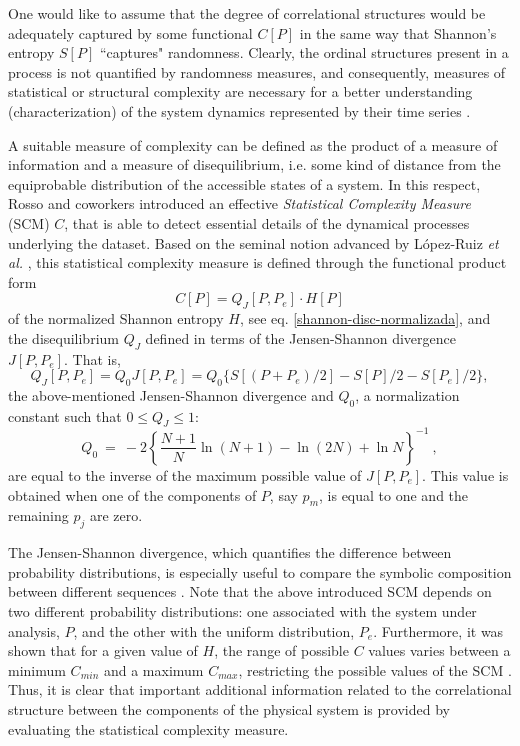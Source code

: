 One would like to assume that the degree of correlational structures would be adequately captured by some functional $C[P]$ in the same way that Shannon's entropy $S[P]$ \cite{Shannon1948} ``captures" randomness.
Clearly, the ordinal structures present in a process is not quantified by randomness measures, and consequently, measures of statistical or structural complexity are necessary for a better understanding (characterization) of the system dynamics represented by their time series \cite{Feldman1998}. 

A suitable measure of complexity can be defined as the product of a measure of information and a measure of
disequilibrium, i.e. some kind of distance from the equiprobable distribution of the accessible states of 
a system. 
In this respect, Rosso and coworkers \cite{Lamberti2004} introduced an effective {\it Statistical Complexity Measure\/} (SCM) $C$, that is able to detect essential details of the dynamical processes underlying the dataset.
Based on the seminal notion advanced by L\'opez-Ruiz {\it et al.} \cite{Lopez-Ruiz1995}, this statistical complexity measure\cite{Martin2003,Lamberti2004} is defined through the functional product form
\begin{equation}
C[P] = Q_{J}[P,P_e] \cdot H[P]
\label{complexity}
\end{equation}
of the normalized Shannon entropy $H$, see eq. \eqref{shannon-disc-normalizada}, and the disequilibrium $Q_{J}$ defined in terms of the Jensen-Shannon divergence $J[P, P_e]$.
That is,
\begin{equation}
\label{disequilibrium}	
Q_{J} [ P, P_e] = Q_{0} J[ P, P_e] = Q_{0} \{ S[(P + P_e)/2 ] - S[ P ]/2 - S[P_e]/2\},
\end{equation}
the above-mentioned Jensen-Shannon divergence and $Q_0$, a normalization constant such that $0 \leq Q_{J} \leq 1$:
\begin{equation}
Q_0 ~=~ -2 \left\{ {\frac{N+1}{N}} \ln (N+1) - \ln (2N) + \ln N \right\}^{-1} \ ,
\label{q0-jensen-1}
\end{equation}
are equal to the inverse of the maximum possible value of $J [P,P_e]$.
This value is obtained when one of the components of $P$, say $p_m$, is equal to one and the remaining $p_j$ are zero.

The Jensen-Shannon divergence, which quantifies the difference between probability distributions, is especially useful to compare the symbolic composition between different sequences \cite{Grosse2002}.
Note that the above introduced SCM depends on two different probability distributions: one associated with the system under analysis, $P$, and the other with the uniform distribution, $P_e$.
Furthermore, it was shown that for a given value of $H$, the range of possible $C$ values varies between a minimum $C_{min}$ and a maximum $C_{max}$, restricting the possible values of the SCM \cite{Martin2006}.
Thus, it is clear that important additional information related to the correlational structure between the components of the physical system is provided by evaluating the statistical complexity measure. 

